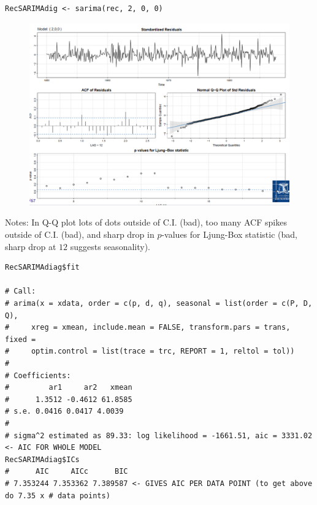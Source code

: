 \documentclass[11pt]{article}
\newcommand{\noi}{\noindent}
\begin{document}
\begin{lstlisting}
RecSARIMAdig <- sarima(rec, 2, 0, 0)
\end{lstlisting}
\begin{figure}[H]
    \centering
    \includegraphics[width=0.8\linewidth]{sarima results for Box-Jenkins Example.png}
\end{figure}
\noi Notes: In Q-Q plot lots of dots outside of C.I. (bad), too many ACF spikes outside of C.I. (bad), and sharp drop in $p$-values for Ljung-Box statistic (bad, sharp drop at $12$ suggests seasonality).

\begin{lstlisting}
RecSARIMAdiag$fit

# Call:
# arima(x = xdata, order = c(p, d, q), seasonal = list(order = c(P, D, Q),
#     xreg = xmean, include.mean = FALSE, transform.pars = trans, fixed =
#     optim.control = list(trace = trc, REPORT = 1, reltol = tol))
#
# Coefficients:
#         ar1     ar2   xmean
#      1.3512 -0.4612 61.8585
# s.e. 0.0416 0.0417 4.0039
#
# sigma^2 estimated as 89.33: log likelihood = -1661.51, aic = 3331.02 <- AIC FOR WHOLE MODEL
RecSARIMAdiag$ICs
#      AIC     AICc      BIC
# 7.353244 7.353362 7.389587 <- GIVES AIC PER DATA POINT (to get above do 7.35 x # data points)
\end{lstlisting}
\end{document}
